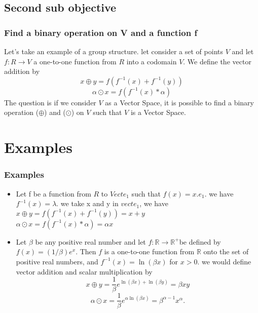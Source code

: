 \documentclass{beamer}
\begin{document}
\subsection{Second sub objective}
\begin{frame}
    \frametitle{Find a binary operation on V and a function f }
    Let's take an example of a group structure.
    let consider a set of points  $ V $ and let  $ f: R \rightarrow V $ a one-to-one
    function from $R$ into a codomain $V$. We define the vector addition by
    $$ x \oplus y = f(f^{-1}(x) + f^{-1}(y)) $$
    $$ \alpha \odot x = f(f^{-1}(x) * \alpha) $$
    The question is if we consider $V$ as a Vector Space, it is possible to find a binary operation ($\oplus$) and ($\odot$) on $V$ such that $V$ is a Vector Space.
\end{frame}
\section{Examples}
\begin{frame}
    \frametitle{Examples}
    \begin{itemize}
        \item Let f be a function from $R$ to $Vect{e_1}$ such that $f(x) = x.e_1$.
        we have $f^{-1}(x) = \lambda$.
            we take x and y in $vect{e_1}$, we have \\
            $x\oplus y = f(f^{-1}(x) + f^{-1}(y)) = x + y$ \\
            $\alpha \odot x = f(f^{-1}(x) * \alpha) = \alpha x$
            \item Let $\beta$ be any positive real number and let $f: \mathbb{R} \rightarrow \mathbb{R}^{+}$be defined by $f(x)=(1 / \beta) e^x$. Then $f$ is a one-to-one function from $\mathbb{R}$ onto the set of positive real numbers, and $f^{-1}(x)=\ln (\beta x)$ for $x>0$. we would define vector addition and scalar multiplication by
            $$
            x \oplus y=\frac{1}{\beta} e^{\ln (\beta x)+\ln (\beta y)}=\beta x y
            $$
            $$
            \alpha \odot x=\frac{1}{\beta} e^{\alpha \ln (\beta x)}=\beta^{\alpha-1} x^\alpha.
            $$
        \end{itemize}
    \end{frame}
\end{document}
